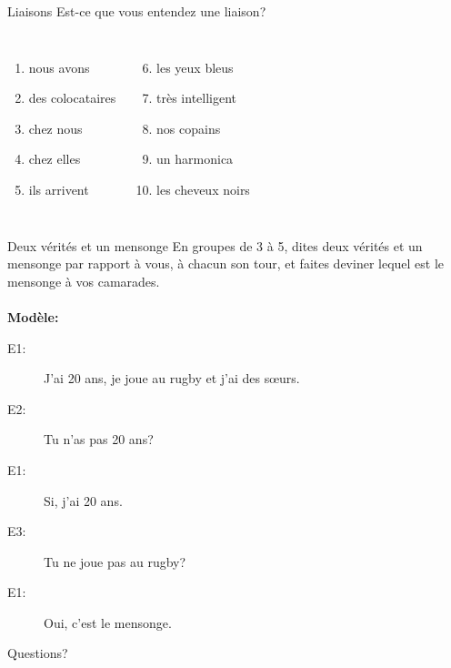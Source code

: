\documentclass{beamer}
\begin{document}
  \begin{frame}{Liaisons}
    Est-ce que vous entendez une liaison?
    \begin{columns}
        \begin{enumerate}
          \item nous avons \underline{}
          \item des colocataires \underline{\uncover<3->{non}}
          \item chez nous \underline{}
          \item chez elles \underline{\uncover<5->{oui}}
          \item ils arrivent \underline{}
        \end{enumerate}
        \begin{enumerate}
          \setcounter{enumi}{5}
          \item les yeux bleus \underline{\uncover<7->{oui}}
          \item très intelligent \underline{}
          \item nos copains \underline{}
          \item un harmonica \underline{}
          \item les cheveux noirs \underline{}
        \end{enumerate}
    \end{columns}
  \end{frame}

  \begin{frame}{Deux vérités et un mensonge }
    En groupes de 3 à 5, dites deux vérités et un mensonge par rapport à vous, à chacun son tour, et faites deviner lequel est le mensonge à vos camarades. \\
     \\
    \textbf{Modèle:} \\
    \begin{description}
      \item[E1:] J'ai 20 ans, je joue au rugby et j'ai des sœurs.
      \item[E2:] Tu n'as pas 20 ans?
      \item[E1:] Si, j'ai 20 ans.
      \item[E3:] Tu ne joue pas au rugby?
      \item[E1:] Oui, c'est le mensonge.
    \end{description}
  \end{frame}

  \begin{frame}{}
    \begin{center}
      \Large Questions?
    \end{center}
  \end{frame}
\end{document}
